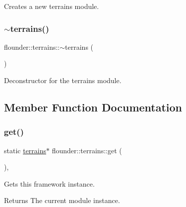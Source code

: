 Creates a new terrains module. 

\mbox{\label{classflounder_1_1terrains_a8d4a252a28eead4a542c35731269c927}} 
\subsubsection{\texorpdfstring{$\sim$terrains()}{~terrains()}}
{\footnotesize\ttfamily flounder\+::terrains\+::$\sim$terrains (\begin{DoxyParamCaption}{ }\end{DoxyParamCaption})}



Deconstructor for the terrains module. 



\subsection{Member Function Documentation}
\mbox{\label{classflounder_1_1terrains_a4570cf86a66188282e88e8e76bacdf25}} 
\subsubsection{\texorpdfstring{get()}{get()}}
{\footnotesize\ttfamily static \hyperlink{classflounder_1_1terrains}{terrains}$\ast$ flounder\+::terrains\+::get (\begin{DoxyParamCaption}{ }\end{DoxyParamCaption})\hspace{0.3cm}{\ttfamily [inline]}, {\ttfamily [static]}}



Gets this framework instance. 

\begin{DoxyReturn}{Returns}
The current module instance. 
\end{DoxyReturn}
\mbox{\label{classflounder_1_1terrains_a4653233110b20bb5249a0913665928df}} 
